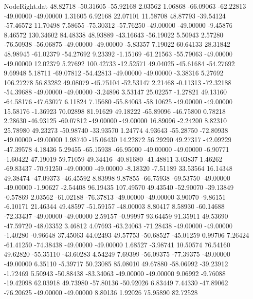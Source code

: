 \begin{filecontents}{NodeRight.dat}
  48.82718  -50.31605  -55.92168     2.03562    1.06868  -66.09063  -62.22813  -49.00000  -49.00000    1.31605    6.92168   22.07101   11.58708
  48.87793  -39.54124  -57.46572    11.70498    7.58655  -75.30312  -57.76250  -49.00000  -49.00000   -9.45876    8.46572  130.34602   84.48338
  48.93889  -43.16643  -56.19022     5.50943    2.57280  -76.50938  -56.06875  -49.00000  -49.00000   -5.83357    7.19022   60.64133   28.31842
  48.98945  -61.02379  -54.27692     9.23392   -1.15169  -61.21563  -55.79063  -49.00000  -49.00000   12.02379    5.27692  100.42733  -12.52571
  49.04025  -45.61684  -54.27692     9.69948    5.18711  -69.07812  -54.42813  -49.00000  -49.00000   -3.38316    5.27692  106.27278   56.83282
  49.08079  -45.75104  -52.53147     2.21468   -0.11313  -72.32188  -54.39688  -49.00000  -49.00000   -3.24896    3.53147   25.02257   -1.27821
  49.13160  -64.58176  -47.63077     6.11824    7.15680  -55.84063  -58.10625  -49.00000  -49.00000   15.58176   -1.36923   70.02898   81.91629
  49.18222  -65.89096  -46.75800     0.78218    2.28630  -46.93125  -60.07812  -49.00000  -49.00000   16.89096   -2.24200    8.82310   25.78980
  49.23273  -50.98740  -33.93570     1.24774    4.93643  -55.28750  -72.80938  -49.00000  -49.00000    1.98740  -15.06430   14.22872   56.29290
  49.27317  -42.09229  -47.39578     4.18436    5.29455  -65.15938  -66.95000  -49.00000  -49.00000   -6.90771   -1.60422   47.19019   59.71059
  49.34416  -40.81680  -41.48811     3.03837    1.46262  -69.83437  -70.91250  -49.00000  -49.00000   -8.18320   -7.51189   33.53564   16.14348
  49.38474  -47.09373  -46.45592     8.83998    9.87855  -66.75938  -69.53750  -49.00000  -49.00000   -1.90627   -2.54408   96.19435  107.49570
  49.43540  -52.90070  -39.13849    -0.57869    2.03562  -61.02188  -76.37813  -49.00000  -49.00000    3.90070   -9.86151   -6.10171   21.46344
  49.48597  -51.59157  -48.00003     8.80417    8.58930  -60.14688  -72.33437  -49.00000  -49.00000    2.59157   -0.99997   93.64459   91.35911
  49.53690  -47.59720  -48.03352     3.46812    4.07693  -63.24063  -71.28438  -49.00000  -49.00000   -1.40280   -0.96648   37.45063   44.02493
  49.57753  -50.68527  -45.01259     0.99706    7.26424  -61.41250  -74.38438  -49.00000  -49.00000    1.68527   -3.98741   10.50574   76.54160
  49.62820  -55.35110  -43.60283     4.54249    7.69399  -56.09375  -77.39375  -49.00000  -49.00000    6.35110   -5.39717   50.23085   85.08010
  49.67880  -58.06992  -39.23912    -1.72469    5.50943  -50.88438  -83.34063  -49.00000  -49.00000    9.06992   -9.76088  -19.42098   62.03918
  49.73980  -57.80136  -50.92026     6.83449    7.44330  -47.89062  -76.20625  -49.00000  -49.00000    8.80136    1.92026   75.95890   82.72528

\end{filecontents}
